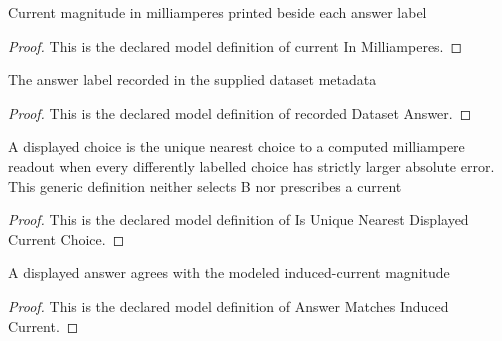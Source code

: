 \begin{definition}
  \label{def:physics:phyx-mini-0926:phyxminiproblems-problemphyxmini0926-answerchoice-currentinmilliamperes}
  Current magnitude in milliamperes printed beside each answer label
\end{definition}
\begin{proof}
  This is the declared model definition of current In Milliamperes.
\end{proof}
\begin{definition}
  \label{def:physics:phyx-mini-0926:phyxminiproblems-problemphyxmini0926-recordeddatasetanswer}
  The answer label recorded in the supplied dataset metadata
\end{definition}
\begin{proof}
  This is the declared model definition of recorded Dataset Answer.
\end{proof}
\begin{definition}
  \label{def:physics:phyx-mini-0926:phyxminiproblems-problemphyxmini0926-isuniquenearestdisplayedcurrentchoice}
  A displayed choice is the unique nearest choice to a computed milliampere readout when every differently labelled choice has strictly larger absolute error. This generic definition neither selects B nor prescribes a current
\end{definition}
\begin{proof}
  This is the declared model definition of Is Unique Nearest Displayed Current Choice.
\end{proof}
\begin{definition}
  \label{def:physics:phyx-mini-0926:phyxminiproblems-problemphyxmini0926-answermatchesinducedcurrent}
  A displayed answer agrees with the modeled induced-current magnitude
\end{definition}
\begin{proof}
  This is the declared model definition of Answer Matches Induced Current.
\end{proof}

